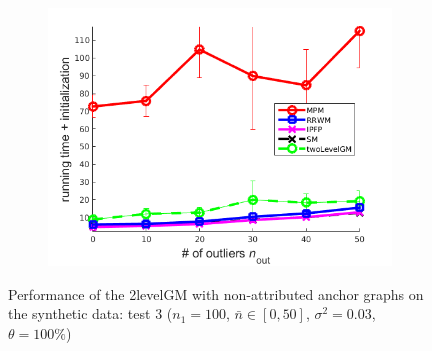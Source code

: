 \begin{figure}[h]
\begin{subfigure}[b]{0.3\textwidth}
			\includegraphics[scale=0.25]{"chapter3/fig/SyntheticTest/no_descr/Results_v4.3.3/Test1/time_summary_avg10t"} 
		\end{subfigure} 	
	\caption[Performance of the 2levelGM with non-attributed anchor graphs on the synthetic data (test $3$)]{Performance of the 2levelGM with non-attributed anchor graphs on the synthetic data: test $3$ ($n_1=100$, $\bar{n}\in[0,50]$, $\sigma^2=0.03$, $\theta=100\%$)}
	\label{fig:synTest3_ver433}
\end{figure}
\vspace{-10pt}
